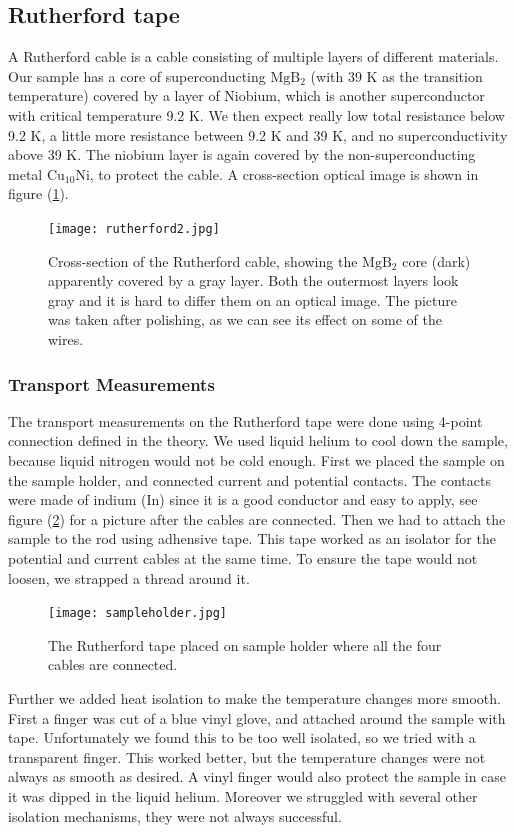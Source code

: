 \documentclass{comjnl}
\newcommand*\chem[1]{\ensuremath{\mathrm{#1}}}
\begin{document}
\subsection{Rutherford tape}
A Rutherford cable is a cable consisting of multiple layers of different materials. Our sample has a core of superconducting \chem{MgB_2} (with 39 K as the transition temperature) covered by a layer of Niobium, which is another superconductor with critical temperature 9.2 K. We then expect really low total resistance below 9.2 K, a little more resistance between 9.2 K and 39 K, and no superconductivity above 39 K. The niobium layer is again covered by the non-superconducting metal \chem{Cu_{10}Ni}, to protect the cable. A cross-section optical image is shown in figure (\ref{fig:rutherford2}).
\begin{figure}[h]
\centering
\texttt{[image: rutherford2.jpg]}
\caption{Cross-section of the Rutherford cable, showing the \chem{MgB_2} core (dark) apparently covered by a gray layer. Both the outermost layers look gray and it is hard to differ them on an optical image. The picture was taken after polishing, as we can see its effect on some of the wires. \label{fig:rutherford2}}
\end{figure}

\subsubsection{Transport Measurements}
The transport measurements on the Rutherford tape were done using 4-point connection defined in the theory. We used liquid helium to cool down the sample, because liquid nitrogen would not be cold enough. First we placed the sample on the sample holder, and connected current and potential contacts. The contacts were made of indium (In) since it is a good conductor and easy to apply, see figure (\ref{fig:sampleholder}) for a picture after the cables are connected. Then we had to attach the sample to the rod using adhensive tape. This tape worked as an isolator for the potential and current cables at the same time. To ensure the tape would not loosen, we strapped a thread around it. 

\begin{figure}[h]
\centering
\texttt{[image: sampleholder.jpg]}
\caption{The Rutherford tape placed on sample holder where all the four cables are connected.  \label{fig:sampleholder}}
\end{figure}

Further we added heat isolation to make the temperature changes more smooth. First a finger was cut of a blue vinyl glove, and attached around the sample with tape. Unfortunately we found this to be too well isolated, so we tried with a transparent finger. This worked better, but the temperature changes were not always as smooth as desired. A vinyl finger would also protect the sample in case it was dipped in the liquid helium. Moreover we struggled with several other isolation mechanisms, they were not always successful. 
\end{document}
